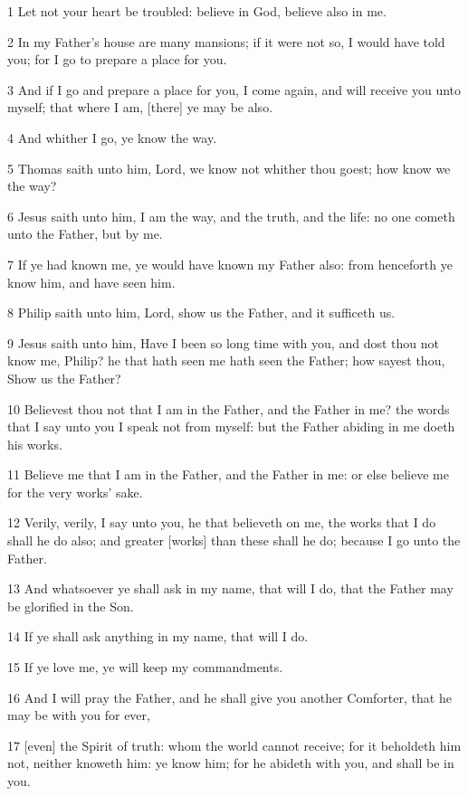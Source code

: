 \par 1 Let not your heart be troubled: believe in God, believe also in me.
\par 2 In my Father's house are many mansions; if it were not so, I would have told you; for I go to prepare a place for you.
\par 3 And if I go and prepare a place for you, I come again, and will receive you unto myself; that where I am, [there] ye may be also.
\par 4 And whither I go, ye know the way.
\par 5 Thomas saith unto him, Lord, we know not whither thou goest; how know we the way?
\par 6 Jesus saith unto him, I am the way, and the truth, and the life: no one cometh unto the Father, but by me.
\par 7 If ye had known me, ye would have known my Father also: from henceforth ye know him, and have seen him.
\par 8 Philip saith unto him, Lord, show us the Father, and it sufficeth us.
\par 9 Jesus saith unto him, Have I been so long time with you, and dost thou not know me, Philip? he that hath seen me hath seen the Father; how sayest thou, Show us the Father?
\par 10 Believest thou not that I am in the Father, and the Father in me? the words that I say unto you I speak not from myself: but the Father abiding in me doeth his works.
\par 11 Believe me that I am in the Father, and the Father in me: or else believe me for the very works' sake.
\par 12 Verily, verily, I say unto you, he that believeth on me, the works that I do shall he do also; and greater [works] than these shall he do; because I go unto the Father.
\par 13 And whatsoever ye shall ask in my name, that will I do, that the Father may be glorified in the Son.
\par 14 If ye shall ask anything in my name, that will I do.
\par 15 If ye love me, ye will keep my commandments.
\par 16 And I will pray the Father, and he shall give you another Comforter, that he may be with you for ever,
\par 17 [even] the Spirit of truth: whom the world cannot receive; for it beholdeth him not, neither knoweth him: ye know him; for he abideth with you, and shall be in you.
